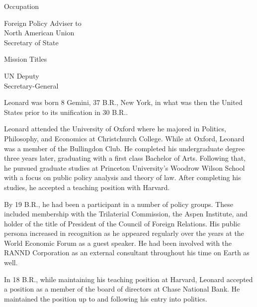 {        \bTR
            \bTC Occupation \eTC
            \bTC 
                \startitemize[4]
                \startpacked
                \item Foreign Policy Adviser to\\North American Union\\Secretary of State
                \stoppacked
                \stopitemize
            \eTC
        \eTR
        
        \bTR
            \bTC Mission Titles \eTC
            \bTC 
                \startitemize[4]
                \startpacked
                \item UN Deputy\\Secretary-General
                \stoppacked
                \stopitemize
            \eTC            
        \eTR
    \eTABLEbody

\eTABLE
}

Leonard was born 8 Gemini, 37 B.R., New York, in what was then the United States prior to its unification in 30 B.R..

Leonard attended the University of Oxford where he majored in Politics, Philosophy, and Economics at Christchurch College. While at Oxford, Leonard was a member of the Bullingdon Club. He completed his undergraduate degree three years later, graduating with a first class Bachelor of Arts. Following that, he pursued graduate studies at Princeton University's Woodrow Wilson School with a focus on public policy analysis and theory of law. After completing his studies, he accepted a teaching position with Harvard.

By 19 B.R., he had been a participant in a number of policy groups. These included membership with the Trilaterial Commission, the Aspen Institute, and holder of the title of President of the Council of Foreign Relations. His public persona increased in recognition as he appeared regularly over the years at the World Economic Forum as a guest speaker. He had been involved with the RANND Corporation as an external consultant throughout his time on Earth as well.

In 18 B.R., while maintaining his teaching position at Harvard, Leonard accepted a position as a member of the board of directors at Chase National Bank. He maintained the position up to and following his entry into politics.

